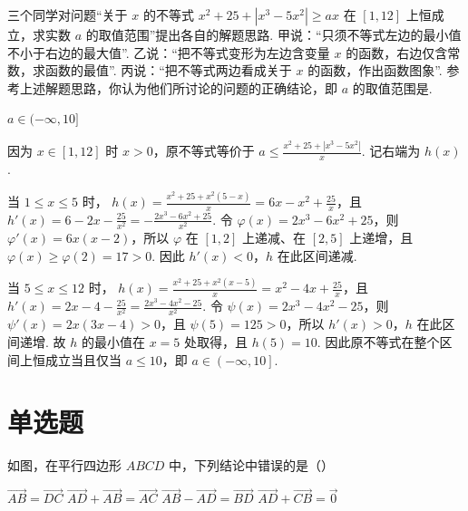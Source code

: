 \begin{problem}
三个同学对问题“关于 \(x\) 的不等式 \(x^{2} + 25 + |x^{3} - 5x^{2}| \geqslant ax\) 在 \([1, 12]\) 上恒成立，求实数 \(a\) 的取值范围”提出各自的解题思路. 甲说：“只须不等式左边的最小值不小于右边的最大值”. 乙说：“把不等式变形为左边含变量 \(x\) 的函数，右边仅含常数，求函数的最值”. 丙说：“把不等式两边看成关于 \(x\) 的函数，作出函数图象”. 参考上述解题思路，你认为他们所讨论的问题的正确结论，即 \(a\) 的取值范围是\fillinblank{}.
\end{problem}

\begin{answer}
\(a\in(-\infty,10]\)
\end{answer}

\begin{solution}
因为 \(x\in\left[1,12\right]\) 时 \(x>0\)，原不等式等价于
\(a\leq\frac{x^2+25+|x^3-5x^2|}{x}\). 记右端为 \(h(x)\).

当 \(1\leq x\leq5\) 时，
\(h(x)=\frac{x^2+25+x^2(5-x)}{x}=6x-x^2+\frac{25}{x}\)，且 \(h'(x)=6-2x-\frac{25}{x^2}=-\frac{2x^3-6x^2+25}{x^2}\). 令 \(\varphi(x)=2x^3-6x^2+25\)，则 \(\varphi'(x)=6x(x-2)\)，所以 \(\varphi\) 在 \([1,2]\) 上递减、在 \([2,5]\) 上递增，且 \(\varphi(x)\geq\varphi(2)=17>0\). 因此 \(h'(x)<0\)，\(h\) 在此区间递减.

当 \(5\leq x\leq12\) 时，
\(h(x)=\frac{x^2+25+x^2(x-5)}{x}=x^2-4x+\frac{25}{x}\)，且 \(h'(x)=2x-4-\frac{25}{x^2}=\frac{2x^3-4x^2-25}{x^2}\). 令 \(\psi(x)=2x^3-4x^2-25\)，则 \(\psi'(x)=2x(3x-4)>0\)，且 \(\psi(5)=125>0\)，所以 \(h'(x)>0\)，\(h\) 在此区间递增. 故 \(h\) 的最小值在 \(x=5\) 处取得，且 \(h(5)=10\). 因此原不等式在整个区间上恒成立当且仅当 \(a\leq10\)，即 \(a\in\left(-\infty,10\right]\).
\end{solution}

\section{单选题}
\begin{problem}
如图，在平行四边形 \(ABCD\) 中，下列结论中错误的是（\quad）


\choices
    {\(\overrightarrow{AB} = \overrightarrow{DC}\)}
    {\(\overrightarrow{AD} +\overrightarrow{AB} = \overrightarrow{AC}\)}
    {\(\overrightarrow{AB} -\overrightarrow{AD} = \overrightarrow{BD}\)}
    {\(\overrightarrow{AD} +\overrightarrow{CB} = \overrightarrow{0}\)}
\end{problem}

